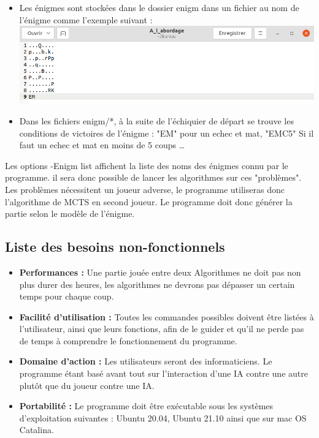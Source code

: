 \documentclass{article}
\begin{document}
\begin{itemize}
\begin{itemize}
            \item Les énigmes sont stockées dans le dossier enigm dans un fichier au nom de l'énigme comme l'exemple suivant : \newline
            \includegraphics[scale = 0.3]{img/a_l_abordage.png}
            \item Dans les fichiers enigm/*, à la suite de l'échiquier de départ se trouve les conditions de victoires de l'énigme : "EM" pour un echec et mat, "EMC5" Si il faut un echec et mat en moins de 5 coups \dots
        \end{itemize}
        Les options -Enigm list affichent la liste des noms des énigmes connu par le programme.
        il sera donc possible de lancer les algorithmes sur ces "problèmes".
        Les problèmes nécessitent un joueur adverse, le programme utiliseras donc l'algorithme de MCTS en second joueur.
        Le programme doit donc générer la partie selon le modèle de l'énigme.
\end{itemize}

\subsection{Liste des besoins non-fonctionnels}
\medskip
\begin{itemize}
    
    \item \textbf{Performances : }
    Une partie jouée entre deux Algorithmes ne doit pas non plus durer des heures, les algorithmes ne devrons pas dépasser un certain temps pour chaque coup.
    \newline
    \item \textbf{Facilité d'utilisation : } 
    Toutes les commandes possibles doivent être listées à l'utilisateur, ainsi que leurs fonctions, afin de le guider et qu'il ne perde pas de temps à comprendre le fonctionnement du programme.
    \newline
    \item \textbf{Domaine d'action : } 
    Les utilisateurs seront des informaticiens. Le programme étant basé avant tout sur l'interaction d'une IA contre une autre plutôt que du joueur contre une IA.
    \newline
    \item \textbf{Portabilité : } 
    \newline
    Le programme doit être exécutable sous les systèmes d'exploitation suivantes : Ubuntu 20.04, Ubuntu 21.10 ainsi que sur mac OS Catalina.
    \newline
    
\end{itemize}
\medskip
\end{document}
